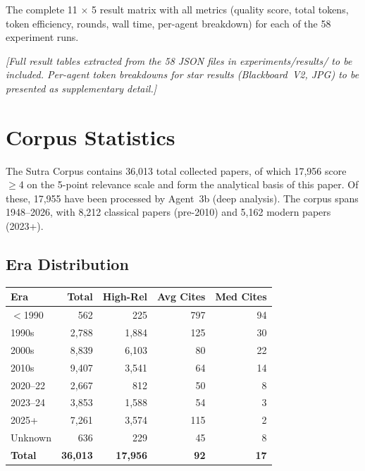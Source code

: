 \documentclass{article}
\begin{document}
The complete 11 $\times$ 5 result matrix with all metrics (quality score, total tokens,
token efficiency, rounds, wall time, per-agent breakdown) for each of the 58 experiment
runs.

\emph{[Full result tables extracted from the 58 JSON files in experiments/results/
to be included. Per-agent token breakdowns for star results (Blackboard~V2, JPG)
to be presented as supplementary detail.]}

\section{Corpus Statistics}
\label{app:corpus}


The Sutra Corpus contains 36,013 total collected papers, of which 17,956 score
$\geq$4 on the 5-point relevance scale and form the analytical basis of this paper.
Of these, 17,955 have been processed by Agent~3b (deep analysis). The corpus spans
1948--2026, with 8,212 classical papers (pre-2010) and 5,162 modern papers (2023+).

\subsection{Era Distribution}

\begin{center}
\small
\begin{tabular}{@{} l r r r r @{}}
\toprule
\textbf{Era} & \textbf{Total} & \textbf{High-Rel} & \textbf{Avg Cites} & \textbf{Med Cites} \\
\midrule
$<$1990   & 562   & 225   & 797 & 94 \\
1990s     & 2,788 & 1,884 & 125 & 30 \\
2000s     & 8,839 & 6,103 & 80  & 22 \\
2010s     & 9,407 & 3,541 & 64  & 14 \\
2020--22  & 2,667 & 812   & 50  & 8  \\
2023--24  & 3,853 & 1,588 & 54  & 3  \\
2025+     & 7,261 & 3,574 & 115 & 2  \\
Unknown   & 636   & 229   & 45  & 8  \\
\midrule
\textbf{Total} & \textbf{36,013} & \textbf{17,956} & \textbf{92} & \textbf{17} \\
\bottomrule
\end{tabular}
\end{center}
\end{document}
